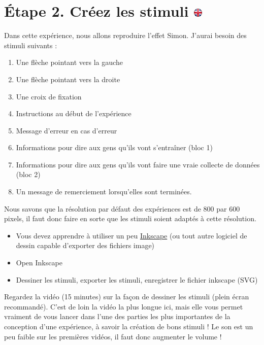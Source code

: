 \documentclass[
]{book}
\providecommand{\tightlist}{%
  \setlength{\itemsep}{0pt}\setlength{\parskip}{0pt}}
\begin{document}
\hypertarget{uxe9tape-2.-cruxe9ez-les-stimuli}{%
\section[Étape 2. Créez les stimuli ]{\texorpdfstring{Étape 2. Créez les stimuli \href{https://www.psytoolkit.org/lessons/project.html\#_step_2_create_new_experiment}{\protect\includegraphics{img/ukflag.png}}}{Étape 2. Créez les stimuli }}\label{uxe9tape-2.-cruxe9ez-les-stimuli}}

Dans cette expérience, nous allons reproduire l'effet Simon. J'aurai besoin des stimuli suivants :

\begin{enumerate}
\def\labelenumi{\arabic{enumi}.}
\tightlist
\item
  Une flèche pointant vers la gauche
\item
  Une flèche pointant vers la droite
\item
  Une croix de fixation
\item
  Instructions au début de l'expérience
\item
  Message d'erreur en cas d'erreur
\item
  Informations pour dire aux gens qu'ils vont s'entraîner (bloc 1)
\item
  Informations pour dire aux gens qu'ils vont faire une vraie collecte de données (bloc 2)
\item
  Un message de remerciement lorsqu'elles sont terminées.
\end{enumerate}

Nous savons que la résolution par défaut des expériences est de 800 par 600 pixels, il faut donc faire en sorte que les stimuli soient adaptés à cette résolution.

\begin{itemize}
\tightlist
\item
  Vous devez apprendre à utiliser un peu \href{https://www.psytoolkit.org/lessons/inkscape.html}{Inkscape} (ou tout autre logiciel de dessin capable d'exporter des fichiers image)
\item
  Open Inkscape
\item
  Dessiner les stimuli, exporter les stimuli, enregistrer le fichier inkscape (SVG)
\end{itemize}

Regardez la vidéo (15 minutes) sur la façon de dessiner les stimuli (plein écran recommandé). C'est de loin la vidéo la plus longue ici, mais elle vous permet vraiment de vous lancer dans l'une des parties les plus importantes de la conception d'une expérience, à savoir la création de bons stimuli !
Le son est un peu faible sur les premières vidéos, il faut donc augmenter le volume !
\end{document}
